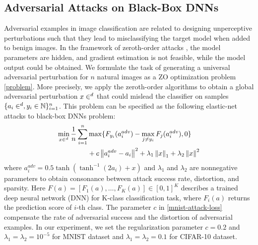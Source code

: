 \documentclass[iicol,sn-basic]{sn-jnl}
\theoremstyle{thmstyleone}%
\theoremstyle{thmstyletwo}%
\theoremstyle{thmstylethree}%
\let\R\relax
\newcommand*{\R}{\mathbb{R}}
\newcommand{\norm}[1]{\left\lVert#1\right\rVert}
\begin{document}
\subsection{Adversarial Attacks on Black-Box DNNs}
Adversarial 
examples in image classification are related to designing unperceptive perturbations such that they lead to misclassifying the target model when added to benign images. In the framework of zeroth-order attacks \cite{chen2017zoo,liu2018zeroth}, the model parameters are hidden, and gradient estimation is not feasible, while
the model output could be obtained. We formulate the task of generating a universal adversarial perturbation for $n$ natural images as a ZO optimization problem \eqref{problem}.
More precisely, we apply the zeroth-order algorithms to obtain a global adversarial perturbation $x\in\R^d$ that could mislead the classifier on samples $\{a_i \in \R^d, y_i\in\mathbb{N} \}_{i=1}^n$. This problem can be specified as the following elastic-net attacks to black-box DNNs problem:
\begin{align}
\min_{x\in\R^d} \frac{1}{n} \sum_{i=1}^n& \max\{F_{y_i}(a_i^{adv}) - \max_{j\neq y_i}F_j(a_i^{adv}),0\}\notag\\
& + c\norm{a_i^{adv} - a_i}^2 + \lambda_1 \norm{x}_{1} + \lambda_2 \norm{x}^{2}\label{mnist-attack-loss}
\end{align}
where $a_i^{adv} = 0.5\tanh(\tanh^{-1}(2a_i)+x)$ and $\lambda_1$ and $\lambda_2$ are nonnegative parameters to obtain consonance between attack success rate, distortion, and sparsity. Here $F(a) = \left[F_1(a),\ldots, F_K(a)\right]\in [0, 1]^K$ describes a trained deep neural network (DNN) for  K-class classification task, where $F_i(a)$ returns the prediction score of $i$-th class. The parameter $c$ in \eqref{mnist-attack-loss} compensate the rate of adversarial success and the distortion of adversarial examples. In our experiment, we set the regularization parameter  $c = 0.2$ and $\lambda_1 = \lambda_2  = 10^{-5}$ for MNIST dataset and $\lambda_1 = \lambda_2  = 0.1$ for CIFAR-10 dataset.
\end{document}

